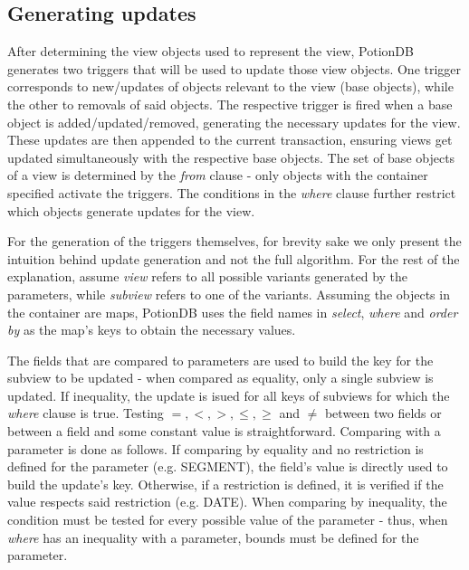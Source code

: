 \documentclass[sigconf, nonacm]{acmart}
\begin{document}
 \subsection{Generating updates}
 \label{subsec:generated_updates}
 
After determining the view objects used to represent the view, PotionDB generates two triggers that will be used to update those view objects.
One trigger corresponds to new/updates of objects relevant to the view (base objects), while the other to removals of said objects.	%
The respective trigger is fired when a base object is added/updated/removed, generating the necessary updates for the view.
These updates are then appended to the current transaction, ensuring views get updated simultaneously with the respective base objects.
The set of base objects of a view is determined by the \emph{from} clause - only objects with the container specified activate the triggers.
The conditions in the \emph{where} clause further restrict which objects generate updates for the view.

For the generation of the triggers themselves, for brevity sake we only present the intuition behind update generation and not the full algorithm.
For the rest of the explanation, assume \emph{view} refers to all possible variants generated by the parameters, while \emph{subview} refers to one of the variants.
Assuming the objects in the container are maps, PotionDB uses the field names in \emph{select}, \emph{where} and \emph{order by} as the map's keys to obtain the necessary values.

The fields that are compared to parameters are used to build the key for the subview to be updated - when compared as equality, only a single subview is updated. If inequality, the update is isued for all keys of subviews for which the \emph{where} clause is true. %
Testing $=, <, >, \leq, \geq$ and $\neq$ between two fields or between a field and some constant value is straightforward. 
Comparing with a parameter is done as follows.
If comparing by equality and no restriction is defined for the parameter (e.g. SEGMENT), the field's value is directly used to build the update's key.
Otherwise, if a restriction is defined, it is verified if the value respects said restriction (e.g. DATE).
When comparing by inequality, the condition must be tested for every possible value of the parameter - thus, when \emph{where} has an inequality with a parameter, bounds must be defined for the parameter.
\end{document}
